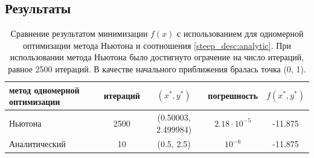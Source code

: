 \documentclass[12pt]{article}%
\begin{document}
\subsection{Результаты}
\begin{table}[!h]
    \centering
    \begin{tabular}{|p{1.5in}|c|c|c|c|}
    \hline \centering метод одномерной оптимизации & 
            итераций & 
            $(x^*, y^*)$ & 
            погрешность & 
            $f(x^*, y^*)$ \\
            
    \hline \centering Ньютона &
            2500 &
            (0.50003, 2.499984) &
            $2.18 \cdot 10^{-5}$ &
            -11.875 \\

    \hline \centering Аналитический & 
            10 & 
            (0.5, 2.5) & 
            $10^{-6}$ & 
            -11.875 \\
    \hline
    
    \end{tabular}
    \caption{Сравнение результатом минимизации $f(x)$ с использованием для одномерной оптимизации метода Ньютона и соотношения \ref{steep_desc:analytic}. При использовании метода Ньютона было достигнуто ограчение на число итераций, равное 2500 итераций. В качестве начального приближения бралась точка (0, 1).}
    \label{tab:my_label}
\end{table}
\end{document}
